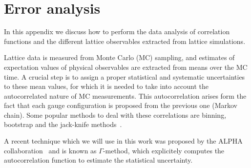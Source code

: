 
\chapter{Error analysis}
\label{apex_errors}

In this appendix we discuss how to perform the data analysis of correlation functions and the different lattice observables extracted from lattice simulations. 

Lattice data is measured from Monte Carlo (MC) sampling, and estimates of expectation values of physical observables are extracted from means over the MC time. A crucial step is to assign a proper statistical and systematic uncertainties to these mean values, for which it is needed to take into account the autocorrelated nature of MC measurements. This autocorrelation arises form the fact that each gauge configuration is proposed from the previous one (Markov chain). Some popular methods to deal with these correlations are binning, bootstrap and the jack-knife methods~\cite{}.

A recent technique which we will use in this work was proposed by the ALPHA collaboration~\cite{Gamma-method} and is known as $\Gamma$-method, which explicitely computes the autocorrelation function to estimate the statistical uncertainty.

